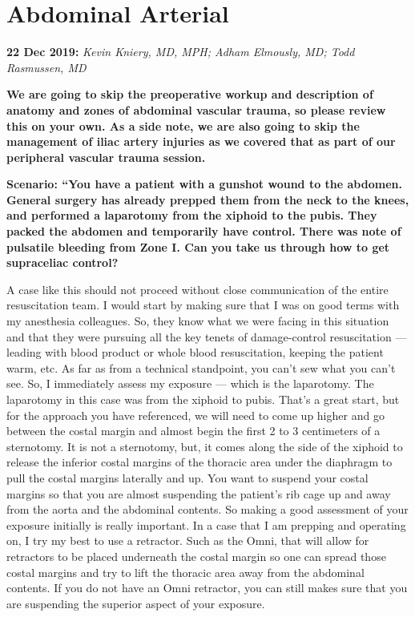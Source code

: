 \documentclass[
]{book}
\begin{document}
\hypertarget{abdominal-arterial}{%
\section{Abdominal Arterial}\label{abdominal-arterial}}

\textbf{22 Dec 2019:} \emph{Kevin Kniery, MD, MPH; Adham Elmously, MD; Todd
Rasmussen, MD}

\textbf{We are going to skip the preoperative workup and description of
anatomy and zones of abdominal vascular trauma, so please review this on
your own. As a side note, we are also going to skip the management of
iliac artery injuries as we covered that as part of our peripheral
vascular trauma session.}

\textbf{Scenario: ``You have a patient with a gunshot wound to the abdomen.
General surgery has already prepped them from the neck to the knees, and
performed a laparotomy from the xiphoid to the pubis. They packed the
abdomen and temporarily have control. There was note of pulsatile
bleeding from Zone I. Can you take us through how to get supraceliac
control?}

A case like this should not proceed without close communication of the
entire resuscitation team. I would start by making sure that I was on
good terms with my anesthesia colleagues. So, they know what we were
facing in this situation and that they were pursuing all the key tenets
of damage-control resuscitation --- leading with blood product or whole
blood resuscitation, keeping the patient warm, etc. As far as from a
technical standpoint, you can't sew what you can't see. So, I
immediately assess my exposure --- which is the laparotomy. The
laparotomy in this case was from the xiphoid to pubis. That's a great
start, but for the approach you have referenced, we will need to come up
higher and go between the costal margin and almost begin the first 2 to
3 centimeters of a sternotomy. It is not a sternotomy, but, it comes
along the side of the xiphoid to release the inferior costal margins of
the thoracic area under the diaphragm to pull the costal margins
laterally and up. You want to suspend your costal margins so that you
are almost suspending the patient's rib cage up and away from the aorta
and the abdominal contents. So making a good assessment of your exposure
initially is really important. In a case that I am prepping and
operating on, I try my best to use a retractor. Such as the Omni, that
will allow for retractors to be placed underneath the costal margin so
one can spread those costal margins and try to lift the thoracic area
away from the abdominal contents. If you do not have an Omni retractor,
you can still makes sure that you are suspending the superior aspect of
your exposure.
\end{document}
